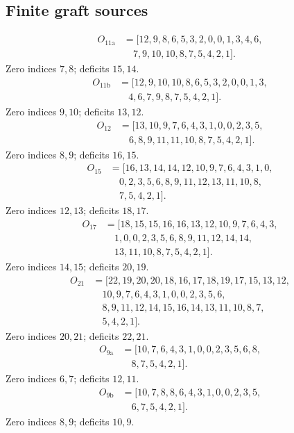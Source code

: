 \documentclass[11pt,a4paper]{article}
\theoremstyle{definition}\newtheorem{definition}[theorem]{Definition}
\theoremstyle{remark}\newtheorem{remark}[theorem]{Remark}
\begin{document}
\subsection{Finite graft sources}
\[\begin{aligned}
O_{11\mathrm a}&=[12,9,8,6,5,3,2,0,0,1,3,4,6,\\
&\quad 7,9,10,10,8,7,5,4,2,1].
\end{aligned}\]
Zero indices $7,8$; deficits $15,14$.
\[\begin{aligned}
O_{11\mathrm b}&=[12,9,10,10,8,6,5,3,2,0,0,1,3,\\
&\quad 4,6,7,9,8,7,5,4,2,1].
\end{aligned}\]
Zero indices $9,10$; deficits $13,12$.
\[\begin{aligned}
O_{12}&=[13,10,9,7,6,4,3,1,0,0,2,3,5,\\
&\quad 6,8,9,11,11,10,8,7,5,4,2,1].
\end{aligned}\]
Zero indices $8,9$; deficits $16,15$.
\[\begin{aligned}
O_{15}&=[16,13,14,14,12,10,9,7,6,4,3,1,0,\\
&\quad 0,2,3,5,6,8,9,11,12,13,11,10,8,\\
&\quad 7,5,4,2,1].
\end{aligned}\]
Zero indices $12,13$; deficits $18,17$.
\[\begin{aligned}
O_{17}&=[18,15,15,16,16,13,12,10,9,7,6,4,3,\\
&\quad 1,0,0,2,3,5,6,8,9,11,12,14,14,\\
&\quad 13,11,10,8,7,5,4,2,1].
\end{aligned}\]
Zero indices $14,15$; deficits $20,19$.
\[\begin{aligned}
O_{21}&=[22,19,20,20,18,16,17,18,19,17,15,13,12,\\
&\quad 10,9,7,6,4,3,1,0,0,2,3,5,6,\\
&\quad 8,9,11,12,14,15,16,14,13,11,10,8,7,\\
&\quad 5,4,2,1].
\end{aligned}\]
Zero indices $20,21$; deficits $22,21$.
\[\begin{aligned}
O_{9\mathrm a}&=[10,7,6,4,3,1,0,0,2,3,5,6,8,\\
&\quad 8,7,5,4,2,1].
\end{aligned}\]
Zero indices $6,7$; deficits $12,11$.
\[\begin{aligned}
O_{9\mathrm b}&=[10,7,8,8,6,4,3,1,0,0,2,3,5,\\
&\quad 6,7,5,4,2,1].
\end{aligned}\]
Zero indices $8,9$; deficits $10,9$.
\end{document}
